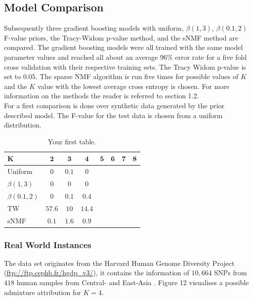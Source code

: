 \documentclass[a4paper, 11pt]{article}
\begin{document}
\subsection{Model Comparison}
Subsequently three gradient boosting models with uniform, $\beta(1,3)$, $\beta(0.1,2)$ F-value priors, the Tracy-Widom p-value method, and the sNMF method are compared. The gradient boosting models were all trained with the same model parameter values and reached all about an average $96\%$ error rate for a five fold cross validation with their respective training sets. The Tracy Widom p-value is set to $0.05$. The sparse NMF algorithm is run five times for possible values of $K$ and the $K$ value with the lowest average cross entropy is chosen. For more information on the methods the reader is referred to section 1.2.\\
For a first comparison is done over synthetic data generated by the prior described model. The F-value for the test data is chosen from a uniform distribution.
\begin{table}[h!]
  \begin{center}
    \label{tab:table4}
    \begin{tabular}{l|c|c|c|c|c|c|r} %
      \textbf{K} & $\mathbf{2}$ & $\mathbf{3}$ & $\mathbf{4}$ & $\mathbf{5}$ & $\mathbf{6}$ & $\mathbf{7}$ & $\mathbf{8}$\\
      \hline
      Uniform & $0$ & $0.1$ & $0$\\
      \hline
      $\beta(1,3)$ & $0$ & $0$ & $0$\\
      \hline
      $\beta(0.1,2)$& $0$ & $0.1$ & $0.4$\\
      \hline
      TW & $57.6$ & $10$ & $14.4$\\
      \hline
      sNMF & $0.1$ & $1.6$ & $0.9$\\
    \end{tabular}
    \caption{Your first table.}
  \end{center}
\end{table}


\subsubsection{Real World Instances}

The data set originates from the Harvard Human Genome Diversity Project (\url{ftp://ftp.cephb.fr/hgdp_v3/}), it contains the information of $10,664$ SNPs from $418$ human samples from Central- and East-Asia \parencite{frichot2012correcting}. Figure 12 visualises a possible admixture attribution for $K = 4$.\\
\end{document}
